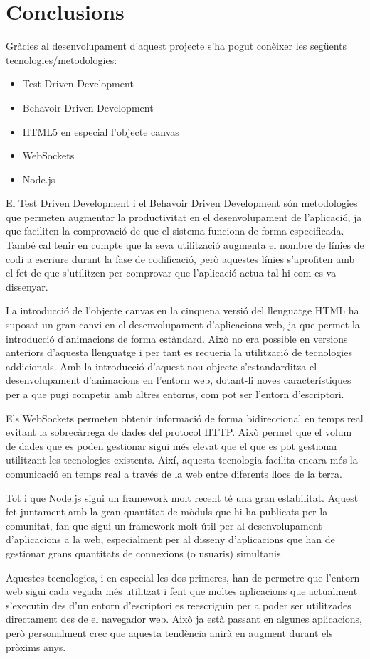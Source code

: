 \chapter{Conclusions}
\label{chap:conclusions}

Gràcies al desenvolupament d'aquest projecte s'ha pogut conèixer les següents tecnologies/metodologies: 

\begin{itemize}
\item{Test Driven Development}
\item{Behavoir Driven Development}
\item{HTML5 en especial l'objecte canvas}
\item{WebSockets}
\item{Node.js}
\end{itemize}

El Test Driven Development i el Behavoir Driven Development són metodologies que permeten augmentar la productivitat en el desenvolupament de l'aplicació, ja que faciliten la comprovació de que el sistema funciona de forma especificada. També cal tenir en compte que la seva utilització augmenta el nombre de línies de codi a escriure durant la fase de codificació, però aquestes línies s'aprofiten amb el fet de que s'utilitzen per comprovar que l'aplicació actua tal hi com es va dissenyar. 

La introducció de l'objecte canvas en la cinquena versió del llenguatge HTML ha suposat un gran canvi en el desenvolupament d'aplicacions web, ja que permet la introducció d'animacions de forma estàndard. Això no era possible en versions anteriors d'aquesta llenguatge i per tant es requeria la utilització de tecnologies addicionals. Amb la introducció d'aquest nou objecte s'estandarditza el desenvolupament d'animacions en l'entorn web, dotant-li noves característiques per a que pugi competir amb altres entorns, com pot ser l'entorn d'escriptori. 

Els WebSockets permeten obtenir informació de forma bidireccional en temps real evitant la sobrecàrrega de dades del protocol HTTP. Això permet que el volum de dades que es poden gestionar sigui més elevat que el que es pot gestionar utilitzant les tecnologies existents. Així, aquesta tecnologia facilita encara més la comunicació en temps real a través de la web entre diferents llocs de la terra. 

Tot i que Node.js sigui un framework molt recent té una gran estabilitat. Aquest fet juntament amb la gran quantitat de mòduls que hi ha publicats per la comunitat, fan que sigui un framework molt útil per al desenvolupament d'aplicacions a la web, especialment per al disseny d'aplicacions que han de gestionar grans quantitats de connexions (o usuaris) simultanis. 

Aquestes tecnologies, i en especial les dos primeres, han de permetre que l'entorn web sigui cada vegada més utilitzat i fent que moltes aplicacions que actualment s'executin des d'un entorn d'escriptori es reescriguin per a poder ser utilitzades directament des de el navegador web. Això ja està passant en algunes aplicacions, però personalment crec que aquesta tendència anirà en augment durant els pròxims anys. 
